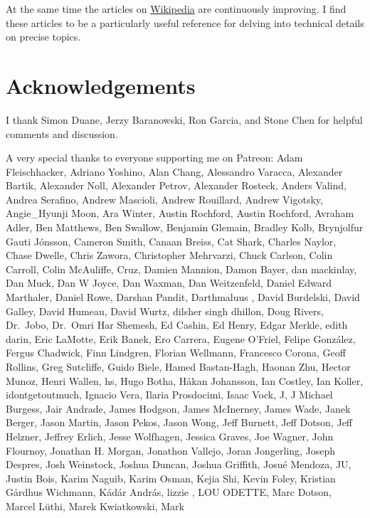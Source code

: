 \documentclass[
  letterpaper,
  DIV=11,
  numbers=noendperiod]{scrartcl}
\begin{document}
At the same time the articles on
\href{https://en.wikipedia.org/wiki/Mathematics}{Wikipedia} are
continuously improving. I find these articles to be a particularly
useful reference for delving into technical details on precise topics.

\hypertarget{acknowledgements}{%
\section*{Acknowledgements}\label{acknowledgements}}

I thank Simon Duane, Jerzy Baranowski, Ron Garcia, and Stone Chen for
helpful comments and discussion.

A very special thanks to everyone supporting me on Patreon: Adam
Fleischhacker, Adriano Yoshino, Alan Chang, Alessandro Varacca,
Alexander Bartik, Alexander Noll, Alexander Petrov, Alexander Rosteck,
Anders Valind, Andrea Serafino, Andrew Mascioli, Andrew Rouillard,
Andrew Vigotsky, Angie\_Hyunji Moon, Ara Winter, Austin Rochford, Austin
Rochford, Avraham Adler, Ben Matthews, Ben Swallow, Benjamin Glemain,
Bradley Kolb, Brynjolfur Gauti Jónsson, Cameron Smith, Canaan Breiss,
Cat Shark, Charles Naylor, Chase Dwelle, Chris Zawora, Christopher
Mehrvarzi, Chuck Carlson, Colin Carroll, Colin McAuliffe, Cruz, Damien
Mannion, Damon Bayer, dan mackinlay, Dan Muck, Dan W Joyce, Dan Waxman,
Dan Weitzenfeld, Daniel Edward Marthaler, Daniel Rowe, Darshan Pandit,
Darthmaluus , David Burdelski, David Galley, David Humeau, David Wurtz,
dilsher singh dhillon, Doug Rivers, Dr.~Jobo, Dr.~Omri Har Shemesh, Ed
Cashin, Ed Henry, Edgar Merkle, edith darin, Eric LaMotte, Erik Banek,
Ero Carrera, Eugene O'Friel, Felipe González, Fergus Chadwick, Finn
Lindgren, Florian Wellmann, Francesco Corona, Geoff Rollins, Greg
Sutcliffe, Guido Biele, Hamed Bastan-Hagh, Haonan Zhu, Hector Munoz,
Henri Wallen, hs, Hugo Botha, Håkan Johansson, Ian Costley, Ian Koller,
idontgetoutmuch, Ignacio Vera, Ilaria Prosdocimi, Isaac Vock, J, J
Michael Burgess, Jair Andrade, James Hodgson, James McInerney, James
Wade, Janek Berger, Jason Martin, Jason Pekos, Jason Wong, Jeff Burnett,
Jeff Dotson, Jeff Helzner, Jeffrey Erlich, Jesse Wolfhagen, Jessica
Graves, Joe Wagner, John Flournoy, Jonathan H. Morgan, Jonathon Vallejo,
Joran Jongerling, Joseph Despres, Josh Weinstock, Joshua Duncan, Joshua
Griffith, Josué Mendoza, JU, Justin Bois, Karim Naguib, Karim Osman,
Kejia Shi, Kevin Foley, Kristian Gårdhus Wichmann, Kádár András, lizzie
, LOU ODETTE, Marc Dotson, Marcel Lüthi, Marek Kwiatkowski, Mark
\end{document}
